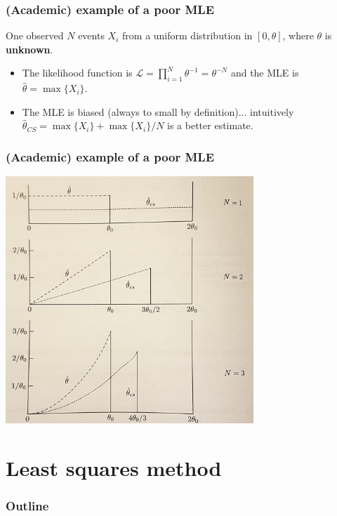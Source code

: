 \documentclass[9pt]{beamer}
\begin{document}
\begin{frame}
 \frametitle{(Academic) example of a poor MLE}
 
 One observed $N$ events $X_i$ from a uniform distribution in $[0,\theta]$, where $\theta$ is \textbf{unknown}. 
 
 \begin{itemize}
  \item The likelihood function is $\mathcal{L} = \prod_{i=1}^N \theta^{-1} = \theta^{-N}$ and the MLE is $\hat{\theta} = \max\{X_i\}$.
  \item The MLE is biased (always to small by definition)... intuitively $\hat{\theta}_{CS} = \max\{X_i\} + \max\{X_i\}/N$ is a better estimate.
 \end{itemize}
\end{frame}

\begin{frame}
 \frametitle{(Academic) example of a poor MLE}
 
 \begin{center}
  \includegraphics[width=0.7\textwidth]{academic_MLE.jpg}
 \end{center}

\end{frame}



\section{Least squares method}

\begin{frame}
 \frametitle{Outline}
 
 \tableofcontents[current]
\end{frame}
\end{document}
